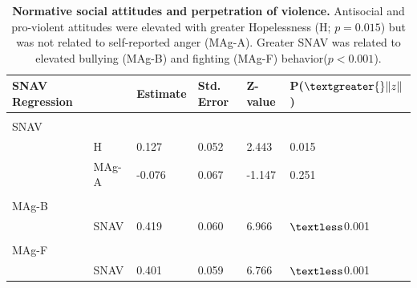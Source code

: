 \documentclass[utf8]{article}
\begin{document}
\begin{table}[h!]
\end{table}

\begin{table}[]
\begin{tabular}{llllll}
SNAV Regression &       & Estimate & Std. Error & Z-value & P($\textgreater{}\|z\|$) \\ \hline
                      &       &          &            &         &                          \\
SNAV                  &       &          &            &         &                          \\
                      & H     & 0.127    & 0.052      & 2.443   & 0.015                    \\
                      & MAg-A & -0.076   & 0.067      & -1.147  & 0.251 \\
                      &       &          &            &         &                          \\
MAg-B                 &       &          &            &         &                          \\
                      & SNAV  & 0.419    & 0.060      & 6.966   & $\textless$0.001                    \\
                      &       &          &            &         &                          \\
MAg-F                 &       &          &            &         &                          \\
                      & SNAV  & 0.401    & 0.059      & 6.766   & $\textless$0.001                   
\end{tabular}
\caption{\textbf{Normative social attitudes and perpetration of violence.} Antisocial and pro-violent attitudes were elevated with greater Hopelessness (H; $p=0.015$) but was not related to self-reported anger (MAg-A). Greater SNAV was related to elevated bullying (MAg-B) and fighting (MAg-F) behavior($p<0.001$). \label{tab:13}}
\end{table}
\clearpage
\end{document}
